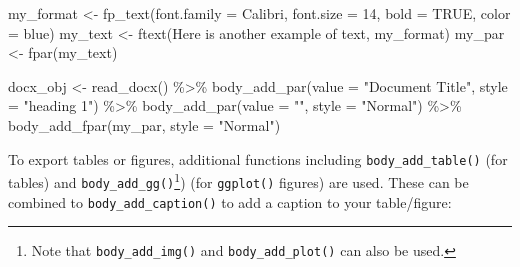 \documentclass[
]{krantz}
\makeatletter
\newenvironment{Shaded}{\begin{snugshade}}{\end{snugshade}}
\newcommand{\AttributeTok}[1]{\textcolor[rgb]{0.61,0.61,0.61}{#1}}
\newcommand{\ConstantTok}[1]{\textcolor[rgb]{0,0,0}{#1}}
\newcommand{\DecValTok}[1]{\textcolor[rgb]{0.06,0.06,0.06}{#1}}
\newcommand{\FunctionTok}[1]{\textcolor[rgb]{0,0,0}{#1}}
\newcommand{\NormalTok}[1]{#1}
\newcommand{\OtherTok}[1]{\textcolor[rgb]{0.37,0.37,0.37}{#1}}
\newcommand{\SpecialCharTok}[1]{\textcolor[rgb]{0,0,0}{#1}}
\newcommand{\StringTok}[1]{\textcolor[rgb]{0.5,0.5,0.5}{#1}}
\newenvironment{kframe}{%
\medskip{}
\setlength{\fboxsep}{.8em}
 \def\at@end@of@kframe{}%
 \ifinner\ifhmode%
  \def\at@end@of@kframe{\end{minipage}}%
  \begin{minipage}{\columnwidth}%
 \fi\fi%
 \def\FrameCommand##1{\hskip\@totalleftmargin \hskip-\fboxsep
 \colorbox{shadecolor}{##1}\hskip-\fboxsep
     \hskip-\linewidth \hskip-\@totalleftmargin \hskip\columnwidth}%
 \MakeFramed {\advance\hsize-\width
   \@totalleftmargin\z@ \linewidth\hsize
   \@setminipage}}%
 {\par\unskip\endMakeFramed%
 \at@end@of@kframe}
\renewenvironment{Shaded}{\begin{kframe}}{\end{kframe}}
\makeatother
\begin{document}
\begin{Shaded}
\begin{Highlighting}[]
\NormalTok{my\_format }\OtherTok{\textless{}{-}} \FunctionTok{fp\_text}\NormalTok{(}\AttributeTok{font.family =} \StringTok{\textquotesingle{}Calibri\textquotesingle{}}\NormalTok{, }\AttributeTok{font.size =} \DecValTok{14}\NormalTok{, }
                     \AttributeTok{bold =} \ConstantTok{TRUE}\NormalTok{, }\AttributeTok{color =} \StringTok{\textquotesingle{}blue\textquotesingle{}}\NormalTok{)}
\NormalTok{my\_text }\OtherTok{\textless{}{-}} \FunctionTok{ftext}\NormalTok{(}\StringTok{\textquotesingle{}Here is another example of text\textquotesingle{}}\NormalTok{, my\_format)}
\NormalTok{my\_par }\OtherTok{\textless{}{-}} \FunctionTok{fpar}\NormalTok{(my\_text)}

\NormalTok{docx\_obj }\OtherTok{\textless{}{-}} \FunctionTok{read\_docx}\NormalTok{() }\SpecialCharTok{\%\textgreater{}\%} 
  \FunctionTok{body\_add\_par}\NormalTok{(}\AttributeTok{value =} \StringTok{"Document Title"}\NormalTok{, }\AttributeTok{style =} \StringTok{"heading 1"}\NormalTok{) }\SpecialCharTok{\%\textgreater{}\%} 
  \FunctionTok{body\_add\_par}\NormalTok{(}\AttributeTok{value =} \StringTok{""}\NormalTok{, }\AttributeTok{style =} \StringTok{"Normal"}\NormalTok{) }\SpecialCharTok{\%\textgreater{}\%} 
  \FunctionTok{body\_add\_fpar}\NormalTok{(my\_par, }\AttributeTok{style =} \StringTok{"Normal"}\NormalTok{)}
\end{Highlighting}
\end{Shaded}

To export tables or figures, additional functions including \texttt{body\_add\_table()} (for tables) and \texttt{body\_add\_gg()}\footnote{Note that \texttt{body\_add\_img()} and \texttt{body\_add\_plot()} can also be used.}) (for \texttt{ggplot()} figures) are used. These can be combined to \texttt{body\_add\_caption()} to add a caption to your table/figure:
\end{document}

